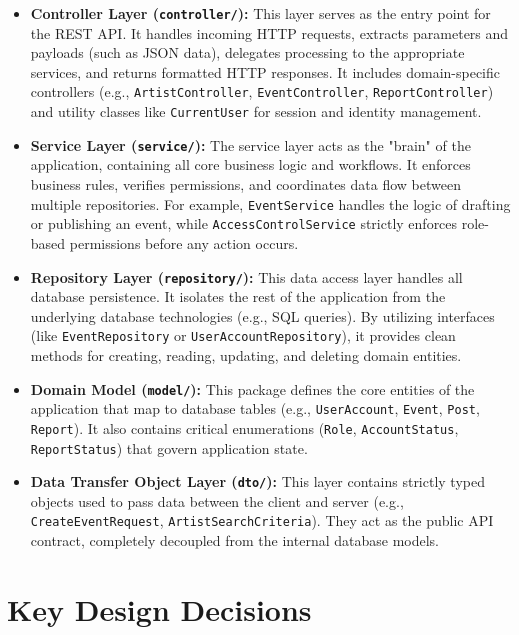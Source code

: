 \documentclass[11pt]{report}
\begin{document}
\begin{itemize}
  \item \textbf{Controller Layer (\texttt{controller/}):} This layer serves as the entry point for the REST API. It handles incoming HTTP requests, extracts parameters and payloads (such as JSON data), delegates processing to the appropriate services, and returns formatted HTTP responses. It includes domain-specific controllers (e.g., \texttt{ArtistController}, \texttt{EventController}, \texttt{ReportController}) and utility classes like \texttt{CurrentUser} for session and identity management.
  
  \item \textbf{Service Layer (\texttt{service/}):} The service layer acts as the "brain" of the application, containing all core business logic and workflows. It enforces business rules, verifies permissions, and coordinates data flow between multiple repositories. For example, \texttt{EventService} handles the logic of drafting or publishing an event, while \texttt{AccessControlService} strictly enforces role-based permissions before any action occurs.
  
  \item \textbf{Repository Layer (\texttt{repository/}):} This data access layer handles all database persistence. It isolates the rest of the application from the underlying database technologies (e.g., SQL queries). By utilizing interfaces (like \texttt{EventRepository} or \texttt{UserAccountRepository}), it provides clean methods for creating, reading, updating, and deleting domain entities.
  
  \item \textbf{Domain Model (\texttt{model/}):} This package defines the core entities of the application that map to database tables (e.g., \texttt{UserAccount}, \texttt{Event}, \texttt{Post}, \texttt{Report}). It also contains critical enumerations (\texttt{Role}, \texttt{AccountStatus}, \texttt{ReportStatus}) that govern application state.
  
  \item \textbf{Data Transfer Object Layer (\texttt{dto/}):} This layer contains strictly typed objects used to pass data between the client and server (e.g., \texttt{CreateEventRequest}, \texttt{ArtistSearchCriteria}). They act as the public API contract, completely decoupled from the internal database models.
\end{itemize}

\section{Key Design Decisions}
\end{document}
